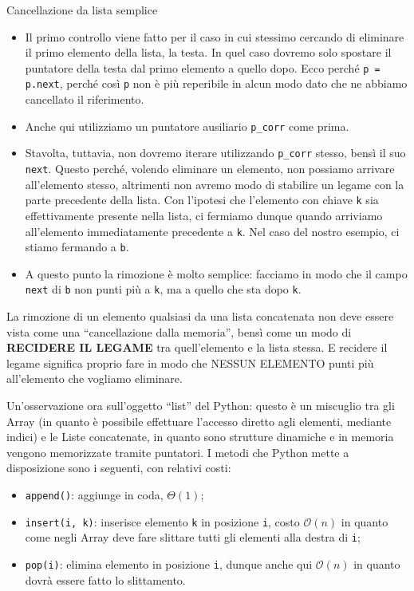 \documentclass[12pt]{report}
\begin{document}
    \begin{algoritmo}{Cancellazione da lista semplice}{}
    	\begin{itemize}
    		
    		\item Il primo controllo viene fatto per il caso in cui stessimo cercando di eliminare il primo elemento della lista, la testa. In quel caso dovremo solo spostare il puntatore della testa dal primo elemento a quello dopo. Ecco perché \texttt{p = p.next}, perché così \texttt{p} non è più reperibile in alcun modo dato che ne abbiamo cancellato il riferimento.
    		
    		\item Anche qui utilizziamo un puntatore ausiliario \texttt{p\_corr} come prima.
    		
    		\item Stavolta, tuttavia, non dovremo iterare utilizzando \texttt{p\_corr} stesso, bensì il suo \texttt{next}. Questo perché, volendo eliminare un elemento, non possiamo arrivare all'elemento stesso, altrimenti non avremo modo di stabilire un legame con la parte precedente della lista. Con l'ipotesi che l'elemento con chiave \texttt{k} sia effettivamente presente nella lista, ci fermiamo dunque quando arriviamo all'elemento immediatamente precedente a \texttt{k}. Nel caso del nostro esempio, ci stiamo fermando a \texttt{b}.
    		
    		\item A questo punto la rimozione è molto semplice: facciamo in modo che il campo \texttt{next} di \texttt{b} non punti più a \texttt{k}, ma a quello che sta dopo \texttt{k}.
    		
    	\end{itemize}
    \end{algoritmo}
    
    La rimozione di un elemento qualsiasi da una lista concatenata non deve essere vista come una ``cancellazione dalla memoria'', bensì come un modo di \textbf{RECIDERE IL LEGAME} tra quell'elemento e la lista stessa. E recidere il legame significa proprio fare in modo che NESSUN ELEMENTO punti più all'elemento che vogliamo eliminare.
    
    Un'osservazione ora sull'oggetto ``list'' del Python: questo è un miscuglio tra gli Array (in quanto è possibile effettuare l'accesso diretto agli elementi, mediante indici) e le Liste concatenate, in quanto sono strutture dinamiche e in memoria vengono memorizzate tramite puntatori. I metodi che Python mette a disposizione sono i seguenti, con relativi costi: 
    \begin{itemize}
    	\item \texttt{append()}: aggiunge in coda, $\Theta(1)$;
    	\item \texttt{insert(i, k)}: inserisce elemento \texttt{k} in posizione \texttt{i}, costo $\mathcal{O}(n)$ in quanto come negli Array deve fare slittare tutti gli elementi alla destra di \texttt{i};
    	\item \texttt{pop(i)}: elimina elemento in posizione \texttt{i}, dunque anche qui $\mathcal{O}(n)$ in quanto dovrà essere fatto lo slittamento.
    \end{itemize}
    
\end{document}
